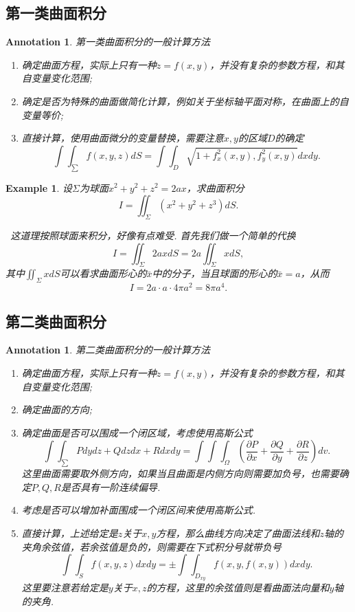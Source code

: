\documentclass{article}
\newtheorem{example}[theorem]{Example}
\newtheorem{annotation}[theorem]{Annotation}
\newcommand{\hints}{{\color{blue} \text{hints}}}
\begin{document}
\subsection{第一类曲面积分}

\begin{annotation}
\rm 第一类曲面积分的一般计算方法
\begin{enumerate}
	\item 确定曲面方程，实际上只有一种$z=f(x,y)$，并没有复杂的参数方程，和其自变量变化范围; 
	\item 确定是否为特殊的曲面做简化计算，例如关于坐标轴平面对称，在曲面上的自变量等价;
	\item 直接计算，使用曲面微分的变量替换，需要注意$x,y$的区域$D$的确定
	$$
\int\int_\sum f(x,y,z)dS = \int\int_D\sqrt{1+f_x^2(x,y),f_y^2(x,y)}dxdy.
$$
\end{enumerate}
\end{annotation}

\begin{example}
\rm 设$\Sigma$为球面$x^2 + y^2 + z^2 = 2ax$，求曲面积分
$$
I =\iint_{\Sigma} (x^2 + y^2 + z^3)dS.
$$

\hints\ 这道理按照球面来积分，好像有点难受. 首先我们做一个简单的代换
$$
I = \iint_{\Sigma} 2ax dS = 2a \iint_{\Sigma} xdS,
$$
其中$\iint_{\Sigma} xdS$可以看求曲面形心的$\bar{x}$中的分子，当且球面的形心的$\bar{x} = a$，从而
$$
I = 2a \cdot a \cdot 4\pi a^2 = 8\pi a^4. 
$$
\end{example}

\subsection{第二类曲面积分}

\begin{annotation}
\rm 第二类曲面积分的一般计算方法
\begin{enumerate}
	\item 确定曲面方程，实际上只有一种$z=f(x,y)$，并没有复杂的参数方程，和其自变量变化范围; 
	\item 确定曲面的方向;
	\item 确定曲面是否可以围成一个闭区域，考虑使用高斯公式
	$$
	\int\int_\sum Pdydz + Qdzdx + Rdxdy = \int\int\int_\Omega (\frac{\partial P}{\partial x}+\frac{\partial Q}{\partial y}+\frac{\partial R}{\partial z})dv.
	$$
	这里曲面需要取外侧方向，如果当且曲面是内侧方向则需要加负号，也需要确定$P,Q,R$是否具有一阶连续偏导. 
	\item 考虑是否可以增加补面围成一个闭区间来使用高斯公式. 
	\item 直接计算，上述给定是$z$关于$x,y$方程，那么曲线方向决定了曲面法线和$z$轴的夹角余弦值，若余弦值是负的，则需要在下式积分号就带负号
	$$
	\int\int_{S} f(x,y,z)dxdy = \pm \int\int_{D_{xy}} f(x,y,f(x,y))dxdy.
	$$
	这里要注意若给定是$y$关于$x,z$的方程，这里的余弦值则是看曲面法向量和$y$轴的夹角. 
\end{enumerate}
\end{annotation}
\end{document}
